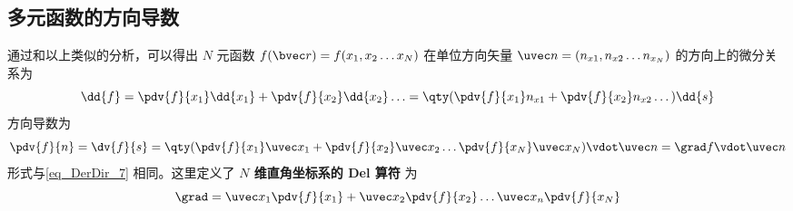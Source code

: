 \subsection{多元函数的方向导数}
通过和以上类似的分析，可以得出 $N$ 元函数 $f(\bvec r) = f(x_1,x_2\dots x_N)$ 在单位方向矢量 $\uvec n = (n_{x1}, n_{x2} \dots n_{x_N})$ 的方向上的微分关系为
\begin{equation}
\dd{f} = \pdv{f}{x_1} \dd{x_1} + \pdv{f}{x_2} \dd{x_2}\ldots = \qty( \pdv{f}{x_1}n_{x1} + \pdv{f}{x_2} n_{x2}\dots ) \dd{s}
\end{equation}
方向导数为
\begin{equation}
\pdv{f}{n} = \dv{f}{s} = \qty( \pdv{f}{x_1}\uvec x_1 + \pdv{f}{x_2}\uvec x_2\ldots  \pdv{f}{x_N}\uvec x_N ) \vdot \uvec n = \grad f \vdot \uvec n
\end{equation} 
形式与\autoref{eq_DerDir_7} 相同。这里定义了\textbf{ $N$ 维直角坐标系的 Del 算符} 为
\begin{equation}
\grad  = \uvec x_1\pdv{f}{x_1} + \uvec x_2\pdv{f}{x_2} \dots \uvec x_n\pdv{f}{x_N}
\end{equation}


